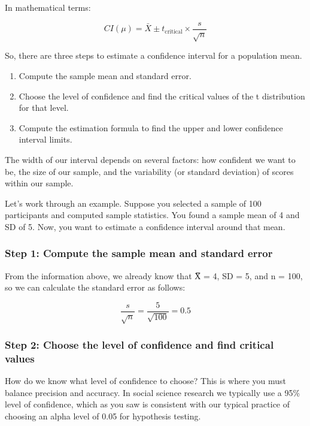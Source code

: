 \documentclass[
  letterpaper,
  DIV=11,
  numbers=noendperiod]{scrreprt}
\begin{document}
In mathematical terms:

\[
CI(\mu) = \bar{X} \pm t_{\text{critical}} \times \frac{s}{\sqrt{n}}
\]

So, there are three steps to estimate a confidence interval for a
population mean.

\begin{enumerate}
\def\labelenumi{\arabic{enumi}.}
\item
  Compute the sample mean and standard error.
\item
  Choose the level of confidence and find the critical values of the t
  distribution for that level.
\item
  Compute the estimation formula to find the upper and lower confidence
  interval limits.
\end{enumerate}

The width of our interval depends on several factors: how confident we
want to be, the size of our sample, and the variability (or standard
deviation) of scores within our sample.

Let's work through an example. Suppose you selected a sample of 100
participants and computed sample statistics. You found a sample mean of
4 and SD of 5. Now, you want to estimate a confidence interval around
that mean.

\subsubsection*{Step 1: Compute the sample mean and standard
error}\label{step-1-compute-the-sample-mean-and-standard-error}

From the information above, we already know that X̅ = 4, SD = 5, and n =
100, so we can calculate the standard error as follows:

\[
\frac{s}{\sqrt{n}} = \frac{5}{\sqrt{100}} = 0.5
\]

\subsubsection*{Step 2: Choose the level of confidence and find critical
values}\label{step-2-choose-the-level-of-confidence-and-find-critical-values}

How do we know what level of confidence to choose? This is where you
must balance precision and accuracy. In social science research we
typically use a 95\% level of confidence, which as you saw is consistent
with our typical practice of choosing an alpha level of 0.05 for
hypothesis testing.
\end{document}
